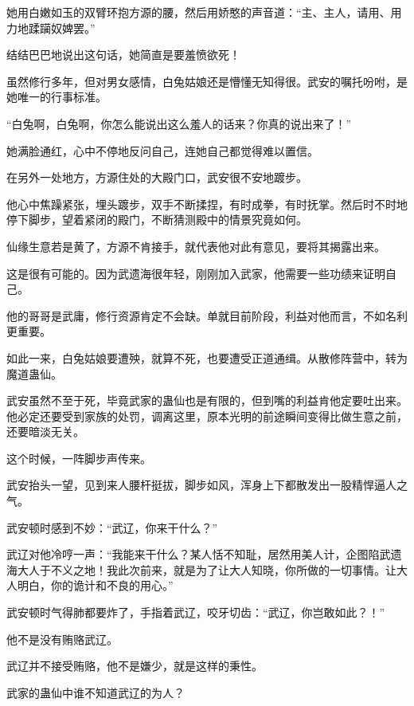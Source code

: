 \begin{this_body}
她用白嫩如玉的双臂环抱方源的腰，然后用娇憨的声音道：“主、主人，请用、用力地蹂躏奴婢罢。”

结结巴巴地说出这句话，她简直是要羞愤欲死！

虽然修行多年，但对男女感情，白兔姑娘还是懵懂无知得很。武安的嘱托吩咐，是她唯一的行事标准。

“白兔啊，白兔啊，你怎么能说出这么羞人的话来？你真的说出来了！”

她满脸通红，心中不停地反问自己，连她自己都觉得难以置信。

在另外一处地方，方源住处的大殿门口，武安很不安地踱步。

他心中焦躁紧张，埋头踱步，双手不断揉捏，有时成拳，有时抚掌。然后时不时地停下脚步，望着紧闭的殿门，不断猜测殿中的情景究竟如何。

仙缘生意若是黄了，方源不肯接手，就代表他对此有意见，要将其揭露出来。

这是很有可能的。因为武遗海很年轻，刚刚加入武家，他需要一些功绩来证明自己。

他的哥哥是武庸，修行资源肯定不会缺。单就目前阶段，利益对他而言，不如名利更重要。

如此一来，白兔姑娘要遭殃，就算不死，也要遭受正道通缉。从散修阵营中，转为魔道蛊仙。

武安虽然不至于死，毕竟武家的蛊仙也是有限的，但到嘴的利益肯他定要吐出来。他必定还要受到家族的处罚，调离这里，原本光明的前途瞬间变得比做生意之前，还要暗淡无关。

这个时候，一阵脚步声传来。

武安抬头一望，见到来人腰杆挺拔，脚步如风，浑身上下都散发出一股精悍逼人之气。

武安顿时感到不妙：“武辽，你来干什么？”

武辽对他冷哼一声：“我能来干什么？某人恬不知耻，居然用美人计，企图陷武遗海大人于不义之地！我此次前来，就是为了让大人知晓，你所做的一切事情。让大人明白，你的诡计和不良的用心。”

武安顿时气得肺都要炸了，手指着武辽，咬牙切齿：“武辽，你岂敢如此？！”

他不是没有贿赂武辽。

武辽并不接受贿赂，他不是嫌少，就是这样的秉性。

武家的蛊仙中谁不知道武辽的为人？

\end{this_body}

